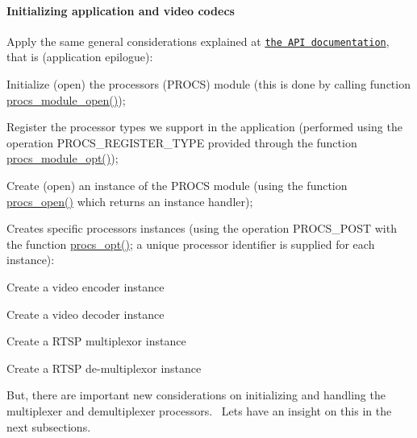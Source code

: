 \paragraph*{Initializing application and video codecs}

Apply the same general considerations explained at \href{md_DOCUMENTATION.html#How_to_use_a_Processor_the_API}{\tt the A\+PI documentation}, that is (application epilogue)\+:


\begin{DoxyEnumerate}
\item Initialize (open) the processors (P\+R\+O\+CS) module (this is done by calling function \textquotesingle{}\hyperlink{procs_8c_af5f91a46882b5706b25327384ba347d8}{procs\+\_\+module\+\_\+open()}\textquotesingle{});
\item Register the processor types we support in the application (performed using the operation \textquotesingle{}P\+R\+O\+C\+S\+\_\+\+R\+E\+G\+I\+S\+T\+E\+R\+\_\+\+T\+Y\+PE\textquotesingle{} provided through the function \textquotesingle{}\hyperlink{procs_8c_a226ac6dfd7598a59b9ceab3a92239a80}{procs\+\_\+module\+\_\+opt()}\textquotesingle{});
\item Create (open) an instance of the P\+R\+O\+CS module (using the function \textquotesingle{}\hyperlink{procs_8c_a6fae33560b633113d848f6ec5e8461e5}{procs\+\_\+open()}\textquotesingle{} which returns an instance handler);
\item Creates specific processors instances (using the operation \textquotesingle{}P\+R\+O\+C\+S\+\_\+\+P\+O\+ST\textquotesingle{} with the function \textquotesingle{}\hyperlink{procs_8c_a7af2e6f2788006cfc96ca8d811922ffa}{procs\+\_\+opt()}\textquotesingle{}; a unique processor identifier is supplied for each instance)\+:
\begin{DoxyItemize}
\item Create a video encoder instance
\item Create a video decoder instance
\item Create a R\+T\+SP multiplexor instance
\item Create a R\+T\+SP de-\/multiplexor instance
\end{DoxyItemize}
\end{DoxyEnumerate}

But, there are important new considerations on initializing and handling the multiplexer and demultiplexer processors.~\newline
 Let\textquotesingle{}s have an insight on this in the next subsections.

